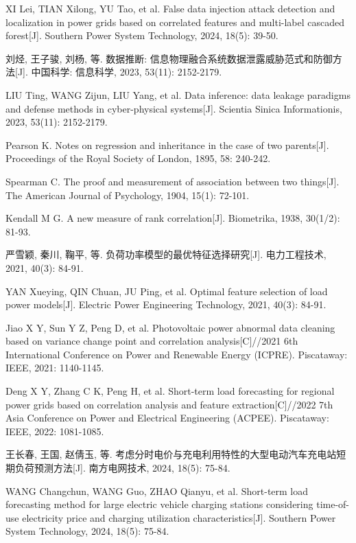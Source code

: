 XI Lei, TIAN Xilong, YU Tao, et al. False data injection attack detection and localization in power grids based on correlated features and multi-label cascaded forest[J]. Southern Power System Technology, 2024, 18(5): 39-50.

刘烃, 王子骏, 刘杨, 等. 数据推断: 信息物理融合系统数据泄露威胁范式和防御方法[J]. 中国科学: 信息科学, 2023, 53(11): 2152-2179.

LIU Ting, WANG Zijun, LIU Yang, et al. Data inference: data leakage paradigms and defense methods in cyber-physical systems[J]. Scientia Sinica Informationis, 2023, 53(11): 2152-2179.

Pearson K. Notes on regression and inheritance in the case of two parents[J]. Proceedings of the Royal Society of London, 1895, 58: 240-242.

Spearman C. The proof and measurement of association between two things[J]. The American Journal of Psychology, 1904, 15(1): 72-101.

Kendall M G. A new measure of rank correlation[J]. Biometrika, 1938, 30(1/2): 81-93.

严雪颖, 秦川, 鞠平, 等. 负荷功率模型的最优特征选择研究[J]. 电力工程技术, 2021, 40(3): 84-91.

YAN Xueying, QIN Chuan, JU Ping, et al. Optimal feature selection of load power models[J]. Electric Power Engineering Technology, 2021, 40(3): 84-91.

Jiao X Y, Sun Y Z, Peng D, et al. Photovoltaic power abnormal data cleaning based on variance change point and correlation analysis[C]//2021 6th International Conference on Power and Renewable Energy (ICPRE). Piscataway: IEEE, 2021: 1140-1145.

Deng X Y, Zhang C K, Peng H, et al. Short-term load forecasting for regional power grids based on correlation analysis and feature extraction[C]//2022 7th Asia Conference on Power and Electrical Engineering (ACPEE). Piscataway: IEEE, 2022: 1081-1085.

王长春, 王国, 赵倩玉, 等. 考虑分时电价与充电利用特性的大型电动汽车充电站短期负荷预测方法[J]. 南方电网技术, 2024, 18(5): 75-84.

WANG Changchun, WANG Guo, ZHAO Qianyu, et al. Short-term load forecasting method for large electric vehicle charging stations considering time-of-use electricity price and charging utilization characteristics[J]. Southern Power System Technology, 2024, 18(5): 75-84.

